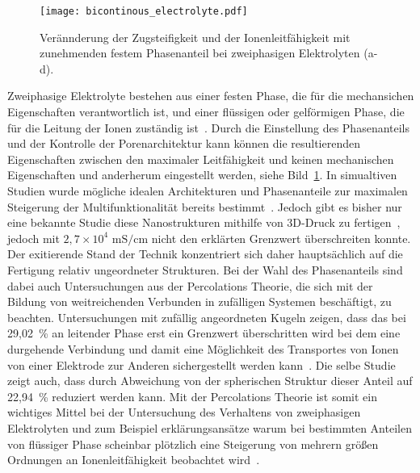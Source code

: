 \begin{figure}[h]
        \center
	\texttt{[image: bicontinous\_electrolyte.pdf]}
		\caption{\label{fig:bicontinous_electrolyte}Verännderung der Zugsteifigkeit und der Ionenleitfähigkeit mit zunehmenden festem Phasenanteil bei zweiphasigen Elektrolyten (a-d).}
\end{figure}
Zweiphasige Elektrolyte bestehen aus einer festen Phase, die für die mechansichen Eigenschaften verantwortlich ist, und einer flüssigen oder gelförmigen Phase, die für die Leitung der Ionen zuständig ist~\cite{Ichino1995}. Durch die Einstellung des Phasenanteils und der Kontrolle der Porenarchitektur kann können die resultierenden Eigenschaften zwischen den maximaler Leitfähigkeit und keinen mechanischen Eigenschaften und anderherum eingestellt werden, siehe Bild~\ref{fig:bicontinous_electrolyte}. In simualtiven Studien wurde mögliche idealen Architekturen und Phasenanteile zur maximalen Steigerung der Multifunktionalität bereits bestimmt~\cite{Lee2019,Tu2020}. Jedoch gibt es bisher nur eine bekannte Studie diese Nanostrukturen mithilfe von 3D-Druck zu fertigen~\cite{Zekoll2018}, jedoch mit $2,7 \times 10^4$ $\si{\milli  \siemens \per \cm}$ nicht den erklärten Grenzwert überschreiten konnte. Der exitierende Stand der Technik konzentriert sich daher hauptsächlich auf die Fertigung relativ ungeordneter Strukturen. Bei der Wahl des Phasenanteils sind dabei auch Untersuchungen aus der Percolations Theorie, die sich mit der Bildung von weitreichenden Verbunden in zufälligen Systemen beschäftigt, zu beachten. Untersuchungen mit zufällig angeordneten Kugeln zeigen, dass das bei 29,02~\% an leitender Phase erst ein Grenzwert überschritten wird bei dem eine durgehende Verbindung und damit eine Möglichkeit des Transportes von Ionen von einer Elektrode zur Anderen sichergestellt werden kann~\cite{Li2020b}. Die selbe Studie zeigt auch, dass durch Abweichung von der spherischen Struktur dieser Anteil auf 22,94~\% reduziert werden kann. Mit der Percolations Theorie ist somit ein wichtiges Mittel bei der Untersuchung des Verhaltens von zweiphasigen Elektrolyten und zum Beispiel erklärungsansätze warum bei bestimmten Anteilen von flüssiger Phase scheinbar plötzlich eine Steigerung von mehrern größen Ordnungen an Ionenleitfähigkeit beobachtet wird~\cite{Melodia2023}.
